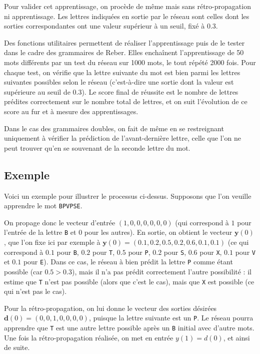 Pour valider cet apprentissage, on procède de même mais sans rétro-propagation ni apprentissage. Les lettres indiquées en sortie par le réseau sont celles dont les sorties correspondantes ont une valeur supérieur à un seuil, fixé à $0.3$.

Des fonctions utilitaires permettent de réaliser l'apprentissage puis de le tester dans le cadre des grammaires de Reber. Elles enchaînent l'apprentissage de 50 mots différents par un test du réseau sur 1000 mots, le tout répété 2000 fois. Pour chaque test, on vérifie que la lettre suivante du mot est bien parmi les lettres suivantes possibles selon le réseau (c'est-à-dire une sortie dont la valeur est supérieure au seuil de $0.3$). Le score final de réussite est le nombre de lettres prédites correctement sur le nombre total de lettres, et on suit l'évolution de ce score au fur et à mesure des apprentissages.

Dans le cas des grammaires doubles, on fait de même en se restreignant uniquement à vérifier la prédiction de l'avant-dernière lettre, celle que l'on ne peut trouver qu'en se souvenant de la seconde lettre du mot.

\subsection{Exemple}
Voici un exemple pour illustrer le processus ci-dessus. Supposons que l'on veuille apprendre le mot \verb+BPVPSE+.

On propage donc le vecteur d'entrée $(1, 0, 0, 0, 0, 0, 0)$ (qui correspond à $1$ pour l'entrée de la lettre \verb+B+ et $0$ pour les autres). En sortie, on obtient le vecteur $\boldsymbol{y}(0)$, que l'on fixe ici par exemple à $\boldsymbol{y}(0)=(0.1, 0.2, 0.5, 0.2, 0.6, 0.1, 0.1)$ (ce qui correspond à $0.1$ pour \verb+B+, $0.2$ pour \verb+T+, $0.5$ pour \verb+P+, $0.2$ pour \verb+S+, $0.6$ pour \verb+X+, $0.1$ pour \verb+V+ et $0.1$ pour \verb+E+). Dans ce cas, le réseau à bien prédit la lettre \verb+P+ comme étant possible (car $0.5>0.3$), mais il n'a pas prédit correctement l'autre possibilité : il estime que \verb+T+ n'est pas possible (alors que c'est le cas), mais que \verb+X+ est possible (ce qui n'est pas le cas).

Pour la rétro-propagation, on lui donne le vecteur des sorties désirées $\boldsymbol{d}(0)=(0, 0, 1, 0, 0, 0, 0)$, puisque la lettre suivante est un \verb+P+. Le réseau pourra apprendre que \verb+T+ est une autre lettre possible après un \verb+B+ initial avec d'autre mots. Une fois la rétro-propagation réalisée, on met en entrée $y(1)=d(0)$, et ainsi de suite.

